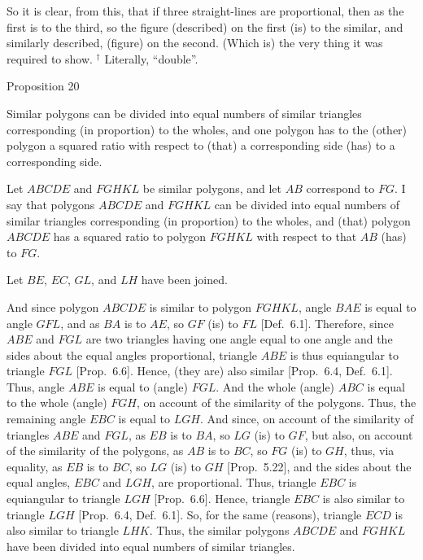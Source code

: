 So it is clear, from this, that if three straight-lines are proportional, then
as the first is to the third, so  the figure (described) on the first (is) to the similar,
and similarly described, (figure) on the second. (Which is) the very thing it
was required to show.
{\footnotesize\noindent$^\dag$ Literally, ``double''.}


\begin{center}
{\large Proposition 20}
\end{center}

Similar polygons can be divided into equal
numbers of similar
triangles corresponding (in proportion) to the wholes, and one
polygon has to the (other) polygon a squared ratio with respect to
(that) a corresponding side (has) to a corresponding side.

\epsfysize=1.8in
\centerline{}

Let $ABCDE$ and $FGHKL$ be similar polygons, and let $AB$ correspond to
$FG$. I say that polygons $ABCDE$ and $FGHKL$ can be divided into equal numbers of similar triangles corresponding (in proportion) to the wholes,
and (that) polygon $ABCDE$ has a squared ratio to polygon
$FGHKL$ with respect to that $AB$ (has) to $FG$.

Let $BE$, $EC$, $GL$, and $LH$ have been joined.

And since polygon $ABCDE$ is similar to polygon $FGHKL$, angle
$BAE$ is equal to angle $GFL$,
and as $BA$ is to $AE$, so $GF$ (is) to $FL$ [Def.~6.1].
Therefore, since $ABE$ and $FGL$ are two triangles having one angle equal
to one angle  and the sides about the equal angles proportional, triangle
$ABE$ is thus equiangular to triangle $FGL$ [Prop.~6.6]. Hence, (they are) also similar
 [Prop.~6.4, Def.~6.1]. Thus, angle $ABE$ is equal to
(angle) $FGL$.  And the whole (angle) $ABC$ is equal to the whole (angle)
$FGH$, on  account of the similarity of the polygons. Thus, the remaining
angle $EBC$ is equal to $LGH$. And since, on account of the similarity of
triangles $ABE$ and $FGL$, as $EB$ is to $BA$, so $LG$ (is) to $GF$, but 
also, on account of the similarity of the polygons, as $AB$ is to $BC$, so
$FG$ (is) to $GH$, thus, via equality, as $EB$ is to $BC$, so $LG$ (is) to $GH$ [Prop.~5.22], and the sides about the
equal angles, $EBC$ and $LGH$, are  proportional. Thus, triangle
$EBC$ is equiangular to triangle $LGH$ [Prop.~6.6]. Hence, triangle $EBC$ is also
similar to triangle $LGH$  [Prop.~6.4, Def.~6.1]. So, for the same (reasons), triangle
$ECD$ is also similar to triangle $LHK$. Thus, the similar
polygons $ABCDE$ and $FGHKL$ have been divided into
equal numbers of similar triangles.

